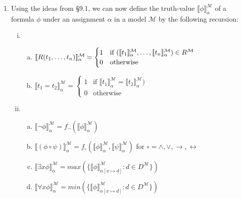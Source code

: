 	\begin{enumerate}[\thesection.1]
			
		\item Using the ideas from \S9.1, we can now define the truth-value $\llbracket\phi\rrbracket^\mathcal{M}_\alpha$ of a formula $\phi$ under an assignment $\alpha$ in a model $\mathcal{M}$ by the following recursion:
		
		\begin{enumerate}[(i)]
			
		  \item	\begin{enumerate}[(a)]

				  \item $\llbracket R(t_1,\mathellipsis, t_n)\rrbracket_\alpha^\mathcal{M}=\begin{cases} 1 & \text{if }(\llbracket t_1\rrbracket^\mathcal{M}_\alpha,\mathellipsis, \llbracket t_n\rrbracket^\mathcal{M}_\alpha)\in R^\mathcal{M}\\0 &\text{otherwise}\end{cases}$

				  \item $\llbracket t_1=t_2\rrbracket_\alpha^\mathcal{M}=\begin{cases} 1 & \text{if }\llbracket t_1\rrbracket^\mathcal{M}_\alpha=\llbracket t_2\rrbracket^\mathcal{M}_\alpha)\\0 &\text{otherwise}\end{cases}$
				\end{enumerate}

		  \item \begin{enumerate}[(a)]

				  \item  $\llbracket\neg \phi\rrbracket^\mathcal{M}_\alpha=f_\neg(\llbracket\phi\rrbracket^\mathcal{M}_\alpha)$

				  \item  $\llbracket(\phi\circ \psi)\rrbracket^\mathcal{M}_\alpha=f_\circ( \llbracket\phi\rrbracket^\mathcal{M}_\alpha, \llbracket\psi\rrbracket^\mathcal{M}_\alpha)$ for $\circ=\land,\lor,\to,\leftrightarrow$

				  \item $\llbracket\exists x\phi\rrbracket_\alpha^\mathcal{M}=max(\{\llbracket \phi\rrbracket^\mathcal{M}_{\alpha[x\mapsto d]}: d\in D^\mathcal{M}\})$

				  \item[] $\llbracket\forall x\phi\rrbracket_\alpha^\mathcal{M}=min(\{\llbracket \phi\rrbracket^\mathcal{M}_{\alpha[x\mapsto d]}: d\in D^\mathcal{M}\})$


\end{enumerate}
\end{enumerate}
\end{enumerate}
